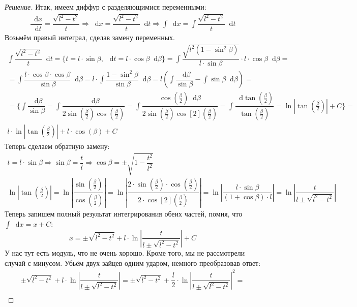 \documentclass[a4paper,12pt]{article}
\renewcommand*\d{\mathop{}\!\mathrm{d}}
\newcommand{\ds}{\displaystyle}
\begin{document}
\begin{proof}[Решение]
	Итак, имеем диффур с разделяющимися переменными:
	\begin{gather*}
		\dfrac{\d x}{\d t} = \dfrac{\sqrt{l^2 - t^2}}{t} \Longrightarrow \d x = \dfrac{\sqrt{l^2 - t^2}}{t}\d t \Longrightarrow \ds\int \d x = \ds \int \dfrac{\sqrt{l^2 - t^2}}{t} \d t
	\end{gather*}
	Возьмём правый интеграл, сделав замену переменных.
	\begin{gather*}
		\ds \int \dfrac{\sqrt{l^2 - t^2}}{t} \d t = \Big\{t = l \cdot \sin \beta,\ \d t = l\cdot \cos \beta \d \beta\Big\} = \ds\int \dfrac{\sqrt{l^2(1 - \sin^2 \beta)}}{l \cdot \sin \beta} \cdot l\cdot \cos \beta \d \beta =\\
		= \ds\int\dfrac{l \cdot \cos \beta \cdot \cos \beta}{\sin \beta}\d \beta = l \cdot \ds\int \dfrac{1 - \sin^2 \beta}{\sin \beta}\d \beta = l \left(\ds\int \dfrac{\d \beta}{\sin\beta} - \ds\int \sin\beta \d \beta\right) = \\
		=\Big\{\ds\int\dfrac{\d \beta}{\sin\beta} = \ds\int\dfrac{\d \beta}{2\sin(\frac{\beta}{2})\cos(\frac{\beta}{2})} = \ds\int\dfrac{\cos(\frac{\beta}{2})\d\beta}{2\sin(\frac{\beta}{2})\cos[2](\frac{\beta}{2})} = \ds\int\dfrac{\d \tan(\frac{\beta}{2})}{\tan(\frac{\beta}{2})} = \ln\left|\tan(\frac{\beta}{2})\right| + C\Big\} = \\
		l\cdot \ln\left|\tan(\frac{\beta}{2})\right| + l \cdot \cos(\beta) + C
	\end{gather*}
	Теперь сделаем обратную замену:
	\begin{gather*}
		t = l\cdot \sin\beta \Longrightarrow \sin\beta = \dfrac{t}{l} \Longrightarrow \cos\beta = \ds\pm\sqrt{1 - \dfrac{t^2}{l^2}}\\
		\ln\left|\tan(\frac{\beta}{2})\right| = \ln\left|\dfrac{\sin(\frac{\beta}{2})}{\cos(\frac{\beta}{2})}\right| = \ln\left|\dfrac{2\cdot \sin(\frac{\beta}{2})\cdot\cos(\frac{\beta}{2})}{2\cdot \cos[2](\frac{\beta}{2})}\right| = \ln\left|\dfrac{l\cdot \sin\beta}{\left(1 + \cos\beta\right)\cdot l}\right| = \ln\left|\dfrac{t}{l \pm \sqrt{l^2 - t^2}}\right|
	\end{gather*}
	Теперь запишем полный результат интегрирования обеих частей, помня, что $\ds\int \d x = x + C$:
	\[x = \ds\pm \sqrt{l^2 - t^2} + l\cdot \ln\left|\dfrac{t}{l \pm \sqrt{l^2 - t^2}}\right| + C\]
	У нас тут есть модуль, что не очень хорошо. Кроме того, мы не рассмотрели случай с минусом. Убьём двух зайцев одним ударом, немного преобразовав ответ:
	\begin{gather*}
		\ds\pm \sqrt{l^2 - t^2} + l\cdot \ln\left|\dfrac{t}{l \pm \sqrt{l^2 - t^2}}\right| = \ds\pm \sqrt{l^2 - t^2} + \dfrac{l}{2}\cdot \ln\left|\dfrac{t}{l \pm \sqrt{l^2 - t^2}}\right|^2 =\\

\end{gather*}
\end{proof}
\end{document}
